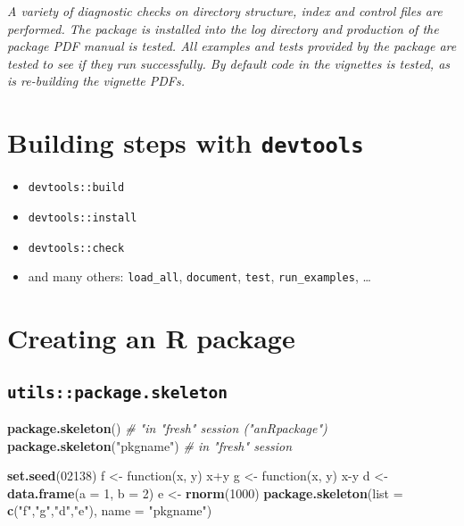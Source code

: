 \documentclass[]{book}
\newenvironment{Shaded}{\begin{snugshade}}{\end{snugshade}}
\newcommand{\KeywordTok}[1]{\textcolor[rgb]{0.13,0.29,0.53}{\textbf{{#1}}}}
\newcommand{\DataTypeTok}[1]{\textcolor[rgb]{0.13,0.29,0.53}{{#1}}}
\newcommand{\DecValTok}[1]{\textcolor[rgb]{0.00,0.00,0.81}{{#1}}}
\newcommand{\StringTok}[1]{\textcolor[rgb]{0.31,0.60,0.02}{{#1}}}
\newcommand{\CommentTok}[1]{\textcolor[rgb]{0.56,0.35,0.01}{\textit{{#1}}}}
\newcommand{\NormalTok}[1]{{#1}}
\theoremstyle{definition}
\theoremstyle{definition}
\theoremstyle{definition}
\theoremstyle{remark}
\begin{document}
\emph{A variety of diagnostic checks on directory structure, index and
control files are performed. The package is installed into the log
directory and production of the package PDF manual is tested. All
examples and tests provided by the package are tested to see if they run
successfully. By default code in the vignettes is tested, as is
re-building the vignette PDFs.}

\section{\texorpdfstring{Building steps with
\texttt{devtools}}{Building steps with devtools}}\label{building-steps-with-devtools}

\begin{itemize}
\item
  \texttt{devtools::build}
\item
  \texttt{devtools::install}
\item
  \texttt{devtools::check}
\item
  and many others: \texttt{load\_all}, \texttt{document}, \texttt{test},
  \texttt{run\_examples}, \ldots{}
\end{itemize}

\section{Creating an R package}\label{creating-an-r-package}

\subsection{\texorpdfstring{\texttt{utils::package.skeleton}}{utils::package.skeleton}}\label{utilspackage.skeleton}

\begin{Shaded}
\begin{Highlighting}[]
\KeywordTok{package.skeleton}\NormalTok{() }\CommentTok{# "in "fresh" session ("anRpackage")}
\KeywordTok{package.skeleton}\NormalTok{(}\StringTok{"pkgname"}\NormalTok{) }\CommentTok{# in "fresh" session}

\KeywordTok{set.seed}\NormalTok{(}\DecValTok{02138}\NormalTok{)}
\NormalTok{f <-}\StringTok{ }\NormalTok{function(x, y) x+y}
\NormalTok{g <-}\StringTok{ }\NormalTok{function(x, y) x-y}
\NormalTok{d <-}\StringTok{ }\KeywordTok{data.frame}\NormalTok{(}\DataTypeTok{a =} \DecValTok{1}\NormalTok{, }\DataTypeTok{b =} \DecValTok{2}\NormalTok{)}
\NormalTok{e <-}\StringTok{ }\KeywordTok{rnorm}\NormalTok{(}\DecValTok{1000}\NormalTok{)}
\KeywordTok{package.skeleton}\NormalTok{(}\DataTypeTok{list =} \KeywordTok{c}\NormalTok{(}\StringTok{"f"}\NormalTok{,}\StringTok{"g"}\NormalTok{,}\StringTok{"d"}\NormalTok{,}\StringTok{"e"}\NormalTok{), }\DataTypeTok{name =} \StringTok{"pkgname"}\NormalTok{)}
\end{Highlighting}
\end{Shaded}
\end{document}
